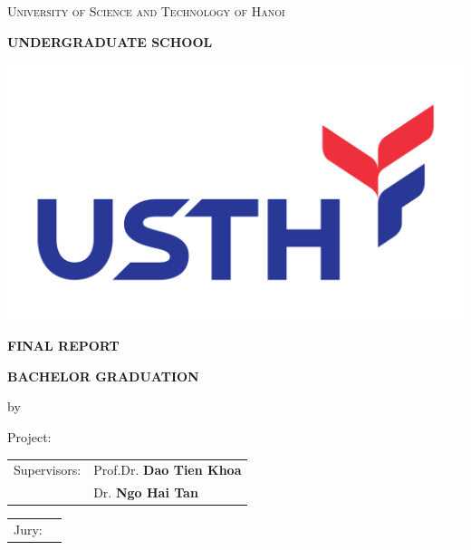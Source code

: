 \documentclass[a4paper,12pt]{report}
\theoremstyle{plain}\newtheorem{ques}{Question}
\theoremstyle{definition}\newtheorem*{ans}{Answer}
\begin{document}
        \begin{boxedminipage}[t]{14.8cm}
            \thispagestyle{empty}
            \centering
            {\scshape\large University of Science and Technology of Hanoi \par}
            {\large\bfseries \MakeUppercase{Undergraduate School} \par}
            \vspace{0.5cm}
            {\includegraphics[scale=0.08,valign=c]{logo/USTH_logo.png}\par}
            \vspace{0.5cm}
            {\Large\bfseries\MakeUppercase{Final Report}\par}
            {\LARGE\bfseries\MakeUppercase{Bachelor Graduation}\par}
            \vspace{0.4cm}
            {\large by\par}
            \vspace{0.3cm}
            {\Large\bfseries \theauthor\par}
            \vspace{1.5cm}
            {\Large Project:\par}
            {\huge \MakeUppercase{\thetitle}\par}
            \vspace{2cm}
            {\Large
            \begin{tabular}{p{3cm} p{7cm}}
                Supervisors: & Prof.Dr. \textbf{Dao Tien Khoa}\\
                             & Dr. \textbf{Ngo Hai Tan}
            \end{tabular}
            }
            \vspace{1cm}
            {\Large
            \begin{tabular}{p{3cm} p{7cm}}
                Jury: & 
            \end{tabular}
            }
            \vfill
            {\large\par}
        \end{boxedminipage}
        
\end{document}
